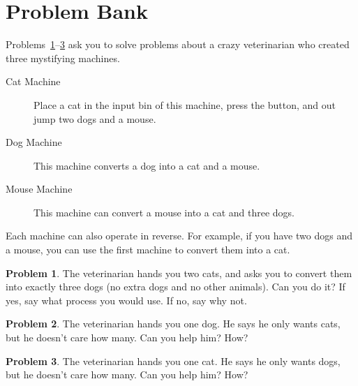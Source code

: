 \documentclass[12pt, reqno]{amsart}
\theoremstyle{remark}
\theoremstyle{definition}
\newtheorem{problem}{Problem}
\numberwithin{equation}{section}  %
\begin{document}
\newpage




\section{Problem Bank}

Problems~\ref{prob:vet1}--\ref{prob:vet3} ask you to solve problems about a crazy veterinarian who created three mystifying machines. 
\begin{description}
\item[Cat Machine]
Place a cat in the input bin of this machine, press the button, and out jump two dogs and a mouse. \\
\item[Dog Machine]
This machine  converts a dog into a cat and a mouse.\\
\item[Mouse Machine]
This machine can convert a mouse into a cat and three dogs. \\
\end{description}
Each machine can also operate in reverse.  For example, if you have two dogs and a mouse, you can use the first machine to convert them into a cat. 

\bigskip

\begin{problem}\label{prob:vet1}
The  veterinarian hands you two cats, and asks you to convert them into exactly three dogs (no extra dogs and no other animals). Can you do it?  If yes, say what process you would use.  If no, say why not.
\end{problem}

\bigskip

\begin{problem}\label{prob:vet2}
The  veterinarian hands you one dog.  He says he only wants cats, but he doesn't care how many.  Can you help him?  How?
\end{problem}

\bigskip
\begin{problem}\label{prob:vet3}
The  veterinarian hands you one cat.  He says he only wants dogs, but he doesn't care how many.  Can you help him?  How?
\end{problem}

\newpage
\end{document}
